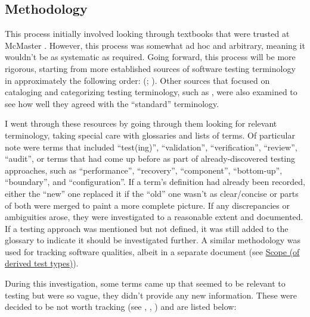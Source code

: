 \subsection{Methodology}

This process initially involved looking through textbooks that were trusted at
McMaster \citep{Patton2006, PetersAndPedrycz2000, vanVliet2000}. However, this
process was somewhat ad hoc and arbitrary, meaning it wouldn't be as systematic
as required. Going forward, this process will be more rigorous, starting from
more established sources of software testing terminology in approximately the
following order:
(\citealp{IEEE2022, SWEBOK2024, SWEBOK2014, IEEE2017, IEEE2013, ISO_IEC2023b,
      IEEE2012, ISO_IEC2023a}; ).
Other sources that focused on cataloging and categorizing testing terminology,
such as \citet{KuļešovsEtAl2013}, were also examined to see how well they
agreed with the ``standard'' terminology.

I went through these resources by going through them looking for relevant
terminology, taking special care with glossaries and lists of terms. Of
particular note were terms that included ``test(ing)'', ``validation'',
``verification'', ``review'', ``audit'', or terms that had come up before
as part of already-discovered testing approaches, such as ``performance'',
``recovery'', ``component'', ``bottom-up'', ``boundary'', and ``configuration''.
If a term's definition had already been recorded, either the ``new'' one
replaced it if the ``old'' one wasn't as clear/concise or parts of both were
merged to paint a more complete picture. If any discrepancies or ambiguities
arose, they were investigated to a reasonable extent and documented. If a
testing approach was mentioned but not defined, it was still added to the
glossary to indicate it should be investigated further. A similar methodology
was used for tracking software qualities, albeit in a separate document
(see \hyperref[chap:notes:sec:derived-from-qualities]{Scope (of derived test types)}).

During this investigation, some terms came up that seemed to be relevant to
testing but were so vague, they didn't provide any new information. These were
decided to be not worth tracking (see , ,
) and are listed below:

